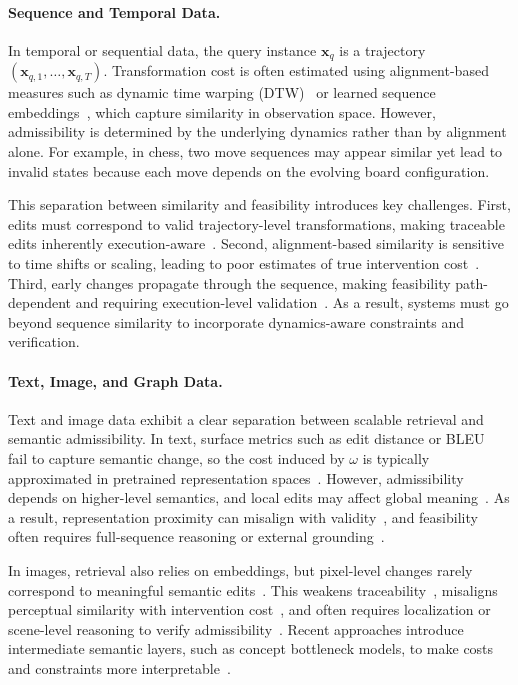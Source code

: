 \paragraph{Sequence and Temporal Data.}
In temporal or sequential data, the query instance $\mathbf{x}_q$ is a trajectory $(\mathbf{x}_{q,1},\dots,\mathbf{x}_{q,T})$. Transformation cost is often estimated using alignment-based measures such as dynamic time warping (DTW)~\cite{senin2008dynamic} or learned sequence embeddings~\cite{nalmpantis2019signal2vec}, which capture similarity in observation space. However, admissibility is determined by the underlying dynamics rather than by alignment alone. For example, in chess, two move sequences may appear similar yet lead to invalid states because each move depends on the evolving board configuration. 

This separation between similarity and feasibility introduces key challenges. First, edits must correspond to valid trajectory-level transformations, making traceable edits inherently execution-aware~\cite{jing2024towards}. Second, alignment-based similarity is sensitive to time shifts or scaling, leading to poor estimates of true intervention cost~\cite{rajput2024evaluating}. Third, early changes propagate through the sequence, making feasibility path-dependent and requiring execution-level validation~\cite{page2006path}. As a result, systems must go beyond sequence similarity to incorporate dynamics-aware constraints and verification.

\paragraph{Text, Image, and Graph Data.}
Text and image data exhibit a clear separation between scalable retrieval and semantic admissibility. In text, surface metrics such as edit distance or BLEU~\cite{papineni2002bleu} fail to capture semantic change, so the cost induced by $\omega$ is typically approximated in pretrained representation spaces~\cite{devlin2019bert}. However, admissibility depends on higher-level semantics, and local edits may affect global meaning~\cite{yin2015multigrancnn}. As a result, representation proximity can misalign with validity~\cite{wang2021robustness}, and feasibility often requires full-sequence reasoning or external grounding~\cite{gu2024survey}. 

In images, retrieval also relies on embeddings, but pixel-level changes rarely correspond to meaningful semantic edits~\cite{narodytska2017simple}. This weakens traceability~\cite{assran2023self}, misaligns perceptual similarity with intervention cost~\cite{zhang2021multi}, and often requires localization or scene-level reasoning to verify admissibility~\cite{gagliardi2025region}. Recent approaches introduce intermediate semantic layers, such as concept bottleneck models, to make costs and constraints more interpretable~\cite{de2025causally,koh2020concept,dominici2025counterfactual}.

